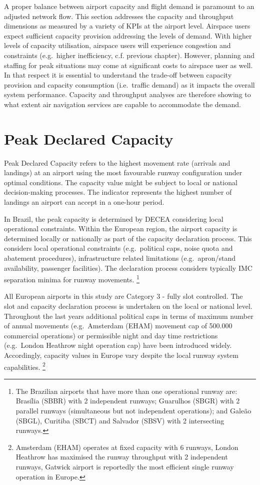 \documentclass[
  a4paper,
  DIV=11,
  numbers=noendperiod]{scrreprt}
\begin{document}
A proper balance between airport capacity and flight demand is paramount
to an adjusted network flow. This section addresses the capacity and
throughput dimensions as measured by a variety of KPIs at the airport
level. Airspace users expect sufficient capacity provision addressing
the levels of demand. With higher levels of capacity utilisation,
airspace users will experience congestion and constraints (e.g.~higher
inefficiency, c.f. previous chapter). However, planning and staffing for
peak situations may come at significant costs to airspace user as well.
In that respect it is essential to understand the trade-off between
capacity provision and capacity consumption (i.e.~traffic demand) as it
impacts the overall system performance. Capacity and throughput analyses
are therefore showing to what extent air navigation services are capable
to accommodate the demand.

\hypertarget{peak-declared-capacity}{%
\section{Peak Declared Capacity}\label{peak-declared-capacity}}

Peak Declared Capacity refers to the highest movement rate (arrivals and
landings) at an airport using the most favourable runway configuration
under optimal conditions. The capacity value might be subject to local
or national decision-making processes. The indicator represents the
highest number of landings an airport can accept in a one-hour period.

In Brazil, the peak capacity is determined by DECEA considering local
operational constraints. Within the European region, the airport
capacity is determined locally or nationally as part of the capacity
declaration process. This considers local operational constraints
(e.g.~political caps, noise quota and abatement procedures),
infrastructure related limitations (e.g.~apron/stand availability,
passenger facilities). The declaration process considers typically IMC
separation minima for runway movements. \footnote{The Brazilian airports
  that have more than one operational runway are: Brasília (SBBR) with 2
  independent runways; Guarulhos (SBGR) with 2 parallel runways
  (simultaneous but not independent operations); and Galeão (SBGL),
  Curitiba (SBCT) and Salvador (SBSV) with 2 intersecting runways.}

All European airports in this study are Category 3 - fully slot
controlled. The slot and capacity declaration process is undertaken on
the local or national level. Throughout the last years additional
political caps in terms of maximum number of annual movements
(e.g.~Amsterdam (EHAM) movement cap of 500.000 commercial operations) or
permissible night and day time restrictions (e.g.~London Heathrow night
operation cap) have been introduced widely. Accordingly, capacity values
in Europe vary despite the local runway system capabilities. \footnote{Amsterdam
  (EHAM) operates at fixed capacity with 6 runways, London Heathrow has
  maximised the runway throughput with 2 independent runways, Gatwick
  airport is reportedly the most efficient single runway operation in
  Europe.}
\end{document}
